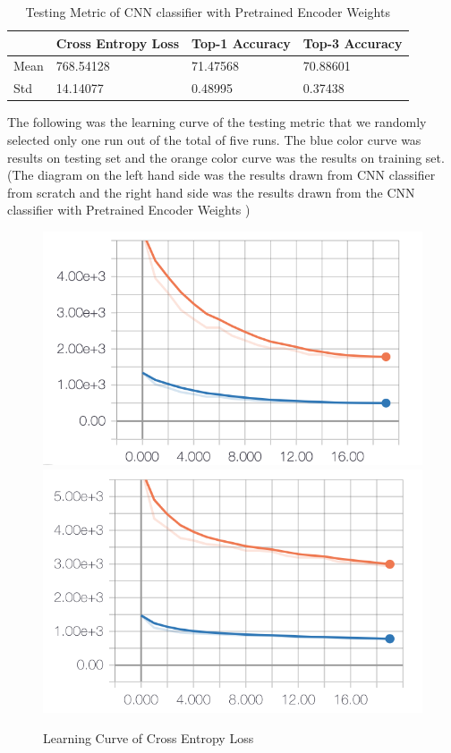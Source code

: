 \documentclass{article}
\begin{document}
\pagebreak

\begin{table}[htb]
\caption{Testing Metric of CNN classifier with Pretrained Encoder Weights }
	\label{sample-table}
	\centering
\begin{tabular}{llll}
\toprule
		\cmidrule{1-4}
		& Cross Entropy Loss & Top-1 Accuracy & Top-3 Accuracy 		\\
	\midrule
 	Mean & 768.54128 & 71.47568 & 70.88601  \\
 	Std & 14.14077 & 0.48995 & 0.37438 \\
\bottomrule
\end{tabular}
\end{table}

The following was the learning curve of the testing metric that we randomly selected only one run out of the total of five runs. The blue color curve was results on testing set and the orange color curve was the results on training set. (The diagram on the left hand side was the results drawn from CNN classifier from scratch and the right hand side was the results drawn from the CNN classifier with Pretrained Encoder Weights )

\begin{figure}[h]
  \centering
  \includegraphics[scale=0.7]{cross_loss_sc.png}
  \includegraphics[scale=0.68]{cross_loss_pre.png}
  \caption{Learning Curve of Cross Entropy Loss}
\end{figure}
\end{document}

